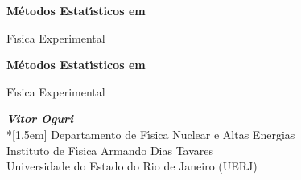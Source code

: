 \pagestyle{empty}
\begin{center}
\vspace*{4.cm}
{\Huge \bf M\'{e}todos Estat\'{\i}sticos em


\vspace*{0.8cm}
F\'{\i}sica Experimental}


\vfill%

\end{center}%
\newpage


\vspace*{5.0cm}
\thispagestyle{empty}
\centerline{}


\newpage
\vspace*{2cm}
\begin{center}
{\Huge \bf M\'{e}todos Estat\'{\i}sticos em


\vspace*{0.8cm}
F\'{\i}sica Experimental}

\vspace{2cm}
{\LARGE \bf \it Vitor Oguri}\\*[1.5em]
{\large {Departamento de F\'{\i}sica Nuclear e Altas Energias \\ Instituto de F\'{\i}sica Armando Dias Tavares\\ Universidade do Estado do Rio de Janeiro (UERJ)}}

\vfill
\end{center}
%

